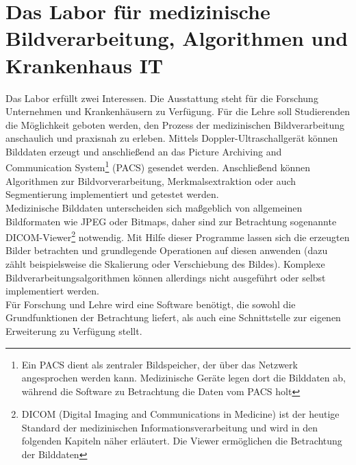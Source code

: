 \section{Das Labor für medizinische Bildverarbeitung, Algorithmen und Krankenhaus IT}\label{einleitung:labor}
Das Labor erfüllt zwei Interessen. Die Ausstattung steht für die Forschung Unternehmen und Krankenhäusern zu Verfügung.
Für die Lehre soll Studierenden die Möglichkeit geboten werden, den Prozess der medizinischen Bildverarbeitung anschaulich und praxisnah zu erleben. Mittels Doppler-Ultraschallgerät können Bilddaten erzeugt und anschließend an das Picture Archiving and Communication System\footnote{Ein PACS dient als zentraler Bildspeicher, der über das Netzwerk angesprochen werden kann. Medizinische Geräte legen dort die Bilddaten ab, während die Software zu Betrachtung die Daten vom PACS holt} (PACS) gesendet werden. Anschließend können Algorithmen zur Bildvorverarbeitung, Merkmalsextraktion oder auch Segmentierung implementiert und getestet werden.\\
Medizinische Bilddaten unterscheiden sich maßgeblich von allgemeinen Bildformaten wie JPEG oder Bitmaps, daher sind zur Betrachtung sogenannte DICOM-Viewer\footnote{DICOM (Digital Imaging and Communications in Medicine) ist der heutige Standard der medizinischen Informationsverarbeitung und wird in den folgenden Kapiteln näher erläutert. Die Viewer ermöglichen die Betrachtung der Bilddaten} notwendig. Mit Hilfe dieser Programme lassen sich die erzeugten Bilder betrachten und grundlegende Operationen auf diesen anwenden (dazu zählt beispielsweise die Skalierung oder Verschiebung des Bildes). Komplexe Bildverarbeitungsalgorithmen können allerdings nicht ausgeführt oder selbst implementiert werden.\\
Für Forschung und Lehre wird eine Software benötigt, die sowohl die Grundfunktionen der Betrachtung liefert, als auch eine Schnittstelle zur eigenen Erweiterung zu Verfügung stellt.

